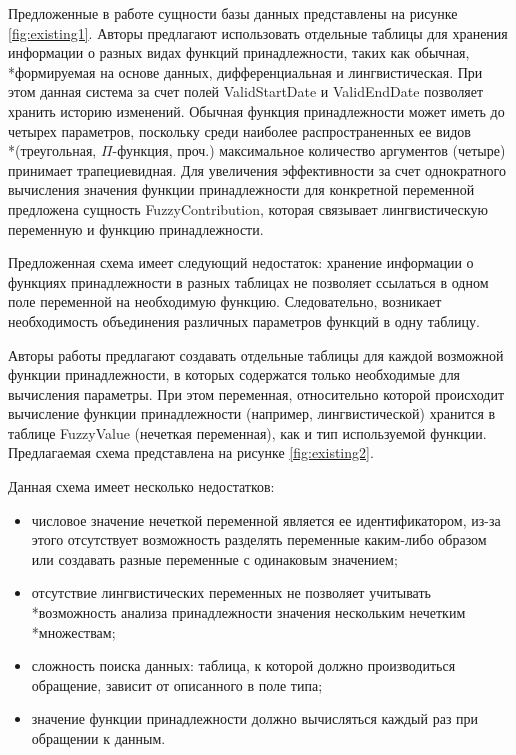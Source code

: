 Предложенные в работе \cite{DefiningFuzz} сущности базы данных представлены на рисунке \ref{fig:existing1}. Авторы предлагают использовать отдельные таблицы для хранения информации о разных видах функций принадлежности, таких как обычная, \\*формируемая на основе данных, дифференциальная и лингвистическая. При этом данная система за счет полей ValidStartDate и ValidEndDate позволяет хранить историю изменений. Обычная функция принадлежности может иметь до четырех параметров, поскольку среди наиболее распространенных ее видов \\*(треугольная, $\Pi$-функция, проч.) максимальное количество аргументов (четыре) принимает трапециевидная. Для увеличения эффективности за счет однократного вычисления значения функции принадлежности для конкретной переменной предложена сущность FuzzyContribution, которая связывает лингвистическую переменную и функцию принадлежности.

Предложенная схема имеет следующий недостаток: хранение информации о функциях принадлежности в разных таблицах не позволяет ссылаться в одном поле переменной на необходимую функцию. Следовательно, возникает необходимость объединения различных параметров функций в одну таблицу. 


Авторы работы \cite{FuzzDb} предлагают создавать отдельные таблицы для каждой возможной функции принадлежности, в которых содержатся только необходимые для вычисления параметры. При этом переменная, относительно которой происходит вычисление функции принадлежности (например, лингвистической) хранится в таблице FuzzyValue (нечеткая переменная), как и тип используемой функции. Предлагаемая схема представлена на рисунке \ref{fig:existing2}.

Данная схема имеет несколько недостатков:
\begin{itemize}
	\item числовое значение нечеткой переменной является ее идентификатором, из-за этого отсутствует возможность разделять переменные каким-либо образом или создавать разные переменные с одинаковым значением;
	\item отсутствие лингвистических переменных не позволяет учитывать \\*возможность анализа принадлежности значения нескольким нечетким \\*множествам;
	\item сложность поиска данных: таблица, к которой должно производиться обращение, зависит от описанного в поле типа;
	\item значение функции принадлежности должно вычисляться каждый раз при обращении к данным.
\end{itemize}

